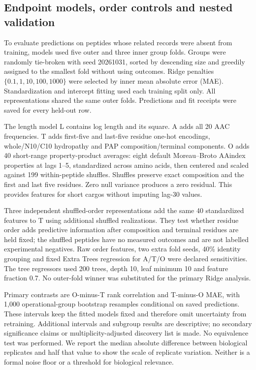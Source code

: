 \documentclass[11pt,a4paper]{article}
\begin{document}
\subsection{Endpoint models, order controls and nested validation}
To evaluate predictions on peptides whose related records were absent
from training, models used five outer and three inner group folds. Groups were randomly
tie-broken with seed 20261031, sorted by descending size and greedily assigned
to the smallest fold without using outcomes. Ridge penalties
$\{0.1,1,10,100,1000\}$ were selected by inner mean absolute error (MAE).
Standardization and intercept fitting used each training split only.
All representations shared the same outer folds. Predictions and fit receipts
were saved for every held-out row.

The length model L contains log length and its square. A adds all 20 AAC
frequencies. T adds first-five and last-five residue one-hot encodings,
whole/N10/C10 hydropathy and PAP composition/terminal components. O adds 40
short-range property-product averages: eight default Moreau--Broto AAindex
properties at lags 1--5, standardized across amino acids, then centered and
scaled against 199 within-peptide shuffles. Shuffles preserve exact composition
and the first and last five residues. Zero null variance produces a zero
residual. This provides features for short cargos without imputing lag-30 values.

Three independent shuffled-order representations add the same 40 standardized
features to T using additional shuffled realizations. They test whether residue order adds predictive information after composition and terminal residues are held fixed; the shuffled
peptides have no measured outcomes and are not labelled experimental negatives.
Raw order features, two extra fold seeds, 40\% identity grouping and fixed
Extra Trees regression for A/T/O were declared sensitivities. The tree
regressors used 200 trees, depth 10, leaf minimum 10 and feature fraction 0.7.
No outer-fold winner was substituted for the primary Ridge analysis.

Primary contrasts are O-minus-T rank correlation and T-minus-O MAE, with
1,000 operational-group bootstrap resamples conditional on saved predictions.
These intervals keep the fitted models fixed and therefore omit uncertainty from retraining. Additional
intervals and subgroup results are descriptive; no secondary significance
claims or multiplicity-adjusted discovery list is made. No equivalence test
was performed. We report the median absolute difference between biological replicates and half that value to show the scale of replicate variation. Neither is a formal noise floor or a threshold for biological relevance.
\end{document}
